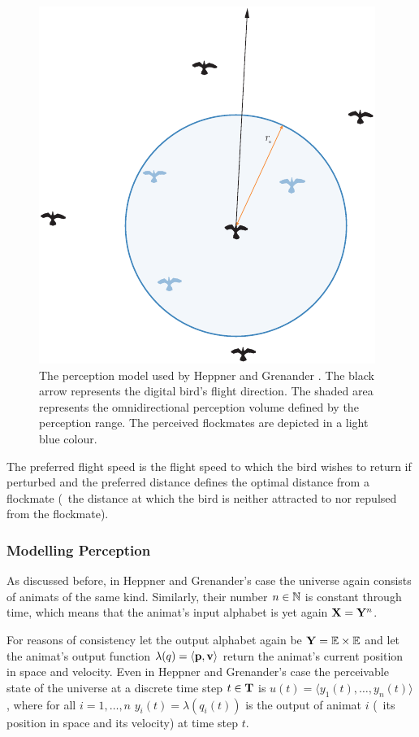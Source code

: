 \begin{figure}%
\includegraphics{fig[perception]fhh}
\caption{The perception model used by Heppner and Grenander \cite{heppner:1990}. The black arrow represents the digital bird's flight direction. The shaded area represents the omnidirectional perception volume defined by the perception range. The perceived flockmates are depicted in a light blue colour.}
\label{fig:perception:fhh}
\end{figure}

The preferred flight speed is the flight speed to which the bird wishes to return if perturbed and the preferred distance defines the optimal distance from a flockmate (\ie\ the distance at which the bird is neither attracted to nor repulsed from the flockmate).

\subsubsection{Modelling Perception}
As discussed before, in Heppner and Grenander's case the universe again consists of animats of the same kind. Similarly, their number $n \in \mathbb{N}$ is constant through time, which means that the animat's input alphabet is yet again ${\mathbf{X}}={\mathbf{Y}}^n$.

For reasons of consistency let the output alphabet again be ${\mathbf{Y}}=\mathbb{E} \times \mathbb{E}$ and let the animat's output function $\lambda(q)=\langle{\ensuremath{\mathbf{p}}},{\mathbf{v}}\rangle$ return the animat's current position in space and velocity. Even in Heppner and Grenander's case the perceivable state of the universe at a discrete time step $t \in {\ensuremath{\mathbf{T}}}$ is $u(t)=\langle y_1(t),\ldots,y_n(t)\rangle$, where for all $i=1,\ldots,n$ $y_i(t)=\lambda(q_i(t))$ is the output of animat $i$ (\ie\ its position in space and its velocity) at time step $t$. 

